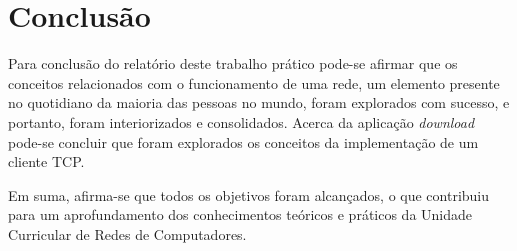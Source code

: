 \section*{Conclusão}
Para conclusão do relatório deste trabalho prático pode-se afirmar que os conceitos relacionados com o funcionamento de uma rede, um elemento presente no quotidiano da maioria das pessoas no mundo, foram explorados com sucesso, e portanto, foram interiorizados e consolidados.
\noindent Acerca da aplicação \emph{download} pode-se concluir que foram explorados os conceitos da implementação de um cliente TCP.

\noindent Em suma, afirma-se que todos os objetivos foram alcançados, o que contribuiu para um aprofundamento dos conhecimentos teóricos e práticos da Unidade Curricular de Redes de Computadores.